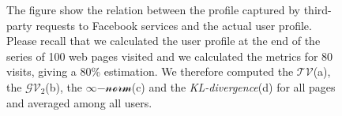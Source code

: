 \begin{figure}
\centering
	\hfil
	
	\hfil

\caption[How Facebook track the user's profile]{The figure show the relation between the profile captured by third-party requests to Facebook services and the actual user profile. Please recall that we calculated the user profile at the end of the series of 100 web pages visited and we calculated the metrics for 80 visits, giving a 80\% estimation.%
We therefore computed the $\mathcal{TV}$(a), the $\mathcal{GV_2}$(b), the $\infty\mathcal{-norm}$(c) and the \emph{KL-divergence}(d) for all pages and averaged among all users.}
\label{fig:average-facebook-pages-tracker}%
\end{figure}

